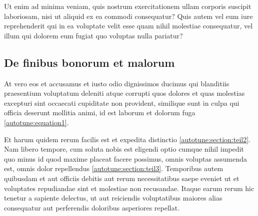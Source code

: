 Ut enim ad minima veniam, quis nostrum exercitationem ullam corporis
suscipit laboriosam, nisi ut aliquid ex ea commodi consequatur?
Quis autem vel eum iure reprehenderit qui in ea voluptate velit
esse quam nihil molestiae consequatur, vel illum qui dolorem eum
fugiat quo voluptas nulla pariatur?

\subsection{De finibus bonorum et malorum
\label{autotune:subsection:finibus}}
At vero eos et accusamus et iusto odio dignissimos ducimus qui
blanditiis praesentium voluptatum deleniti atque corrupti quos
dolores et quas molestias excepturi sint occaecati cupiditate non
provident, similique sunt in culpa qui officia deserunt mollitia
animi, id est laborum et dolorum fuga \eqref{autotune:equation1}.

Et harum quidem rerum facilis est et expedita distinctio
\ref{autotune:section:teil2}.
Nam libero tempore, cum soluta nobis est eligendi optio cumque nihil
impedit quo minus id quod maxime placeat facere possimus, omnis
voluptas assumenda est, omnis dolor repellendus
\ref{autotune:section:teil3}.
Temporibus autem quibusdam et aut officiis debitis aut rerum
necessitatibus saepe eveniet ut et voluptates repudiandae sint et
molestiae non recusandae.
Itaque earum rerum hic tenetur a sapiente delectus, ut aut reiciendis
voluptatibus maiores alias consequatur aut perferendis doloribus
asperiores repellat.


